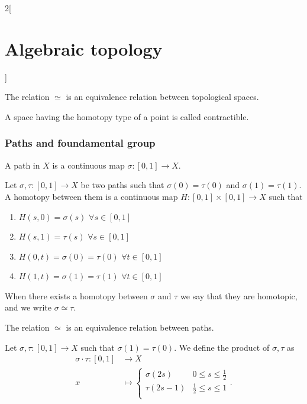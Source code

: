 \documentclass[../../../main.tex]{subfiles}
\begin{document}
\begin{multicols}{2}[\section{Algebraic topology}]
  	\begin{proposition}
		The relation $\simeq$ is an equivalence relation between topological spaces.
	\end{proposition}

	\begin{definition}
		A space having the homotopy type of a point is called contractible.
	\end{definition}
	
	\subsubsection{Paths and foundamental group}
	
	\begin{definition}
		A path in $X$ is a continuous map $\sigma:[0,1]\to X$.
	\end{definition}

	\begin{definition}
		Let $\sigma, \tau : [0,1]\to X$ be two paths such that $\sigma(0)=\tau(0)$ and $\sigma(1)=\tau(1)$. A homotopy between them is a continuous map $H:[0,1]\times [0,1] \to X$ such that
		\begin{enumerate}
			\item $H(s,0)=\sigma(s) $ $\forall s\in [0,1]$
			\item $H(s,1)=\tau(s)$ $\forall s\in [0,1]$
			\item $H(0,t)=\sigma(0)=\tau(0)$ $\forall t\in [0,1]$
			\item $H(1,t)=\sigma(1)=\tau(1)$ $\forall t\in [0,1]$
		\end{enumerate}
	When there exists a homotopy between $\sigma$ and $\tau$ we say that they are homotopic, and we write $\sigma \simeq \tau $.
	\end{definition}

	\begin{proposition}
		The relation $\simeq$ is an equivalence relation between paths.
	\end{proposition}

	\begin{definition}
		Let $\sigma, \tau: [0,1] \to X$ such that $\sigma(1)=\tau(0)$. We define the product of $\sigma, \tau$ as 
		\begin{align*}
			\sigma \cdot \tau: [0,1] &\longrightarrow X \\
			x&\longmapsto \begin{cases}
				\sigma(2s) & 0\leq s \leq \frac{1}{2}\\
				\tau(2s-1)  & \frac{1}{2}\leq s \leq 1\\
			\end{cases}.
		\end{align*}
	

\end{definition}
\end{multicols}
\end{document}
